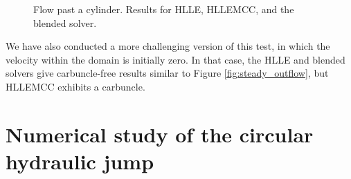 \documentclass[preprint, 11pt]{article}
\begin{document}
\begin{figure}[!h]
{    
  }
  \caption{
    Flow past a cylinder.  Results for HLLE, HLLEMCC, and the blended solver.
    \label{fig:cylinder_flow}}
\end{figure}

We have also conducted a more challenging version of this test, in which
the velocity within the domain is initially zero.  In that case, the HLLE
and blended solvers give carbuncle-free results similar to Figure \ref{fig:steady_outflow},
but HLLEMCC exhibits a carbuncle.

\section{Numerical study of the circular hydraulic jump}
\end{document}
